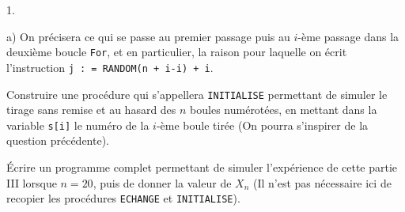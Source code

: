 \documentclass[11pt]{article}%
\begin{document}
\begin{noliste}{1.}
\begin{noliste}{a)}
On précisera ce qui se passe au premier passage puis au $i$-ème
passage dans la deuxième boucle \texttt{For}, et en particulier, la
raison pour laquelle on écrit l'instruction \texttt{j : = RANDOM(n +
i-i) + i}.

\item Construire une procédure qui s'appellera \texttt{INITIALISE}
permettant de simuler le tirage sans remise et au hasard des $n$ boules
numérotées, en mettant dans la variable \texttt{s[i]} le numéro de
la $i$-ème boule tirée (On pourra s'inspirer de la question
précédente).
\end{noliste}

\item Écrire un programme complet permettant de simuler l'expérience
de cette partie III lorsque $n = 20$, puis de donner la valeur de
$X_{n}$ (Il
n'est pas nécessaire ici de recopier les procédures \texttt{ECHANGE}
et \texttt{INITIALISE}).
\end{noliste}
\end{document}
